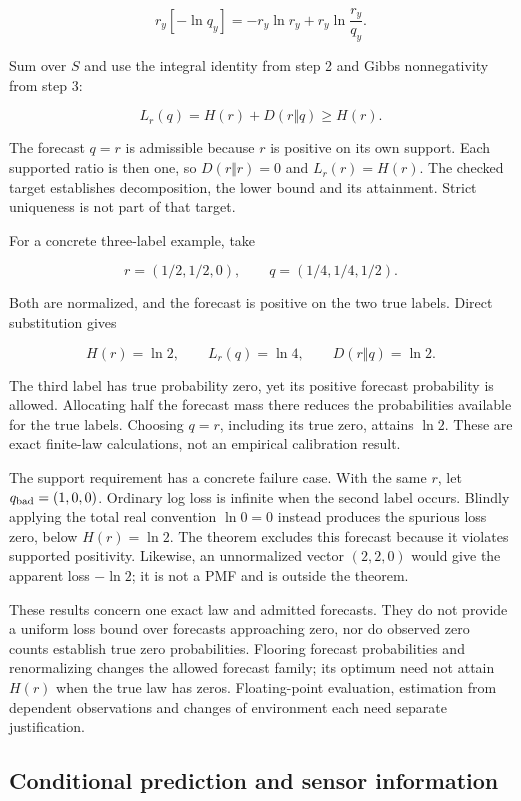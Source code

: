 \documentclass[11pt,a4paper]{article}
\begin{document}
\[
r_y[-\ln q_y]
=-r_y\ln r_y+r_y\ln\frac{r_y}{q_y}.
\]

Sum over \(S\) and use the integral identity from step 2 and Gibbs nonnegativity from step 3:

\[
\boxed{L_r(q)=H(r)+D(r\Vert q)\geq H(r).}
\]

The forecast \(q=r\) is admissible because \(r\) is positive on its own support. Each supported ratio is then one, so \(D(r\Vert r)=0\) and \(L_r(r)=H(r)\). The checked target establishes decomposition, the lower bound and its attainment. Strict uniqueness is not part of that target.

For a concrete three-label example, take

\[
r=(1/2,1/2,0),\qquad q=(1/4,1/4,1/2).
\]

Both are normalized, and the forecast is positive on the two true labels. Direct substitution gives

\[
H(r)=\ln2,\qquad L_r(q)=\ln4,\qquad D(r\Vert q)=\ln2.
\]

The third label has true probability zero, yet its positive forecast probability is allowed. Allocating half the forecast mass there reduces the probabilities available for the true labels. Choosing \(q=r\), including its true zero, attains \(\ln2\). These are exact finite-law calculations, not an empirical calibration result.

The support requirement has a concrete failure case. With the same \(r\), let \(q_{\rm bad}=(1,0,0)\). Ordinary log loss is infinite when the second label occurs. Blindly applying the total real convention \(\ln0=0\) instead produces the spurious loss zero, below \(H(r)=\ln2\). The theorem excludes this forecast because it violates supported positivity. Likewise, an unnormalized vector \((2,2,0)\) would give the apparent loss \(-\ln2\); it is not a PMF and is outside the theorem.

These results concern one exact law and admitted forecasts. They do not provide a uniform loss bound over forecasts approaching zero, nor do observed zero counts establish true zero probabilities. Flooring forecast probabilities and renormalizing changes the allowed forecast family; its optimum need not attain \(H(r)\) when the true law has zeros. Floating-point evaluation, estimation from dependent observations and changes of environment each need separate justification.

\par{}

\subsection{Conditional prediction and sensor information}\label{conditional-prediction-and-sensor-information}
\end{document}
